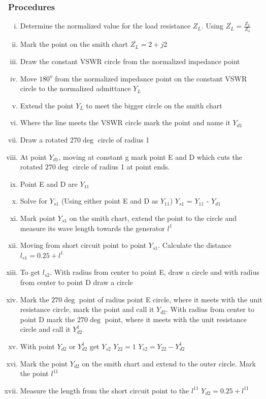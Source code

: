 \begin{exmp}
\subsubsection*{Procedures}
\begin{enumerate}[(i)]
\item Determine the normalized value for the load resistance $Z_{L}$. Using $\overline{Z_{L}} = \frac{Z_{L}}{Z_{o}}$ 
\item Mark the point on the smith chart $\overline{Z_{L}} = 2 + j2$   
\item Draw the constant VSWR circle from the normalized impedance point
\item Move $180^{o}$ from the normalized impedance point on the constant VSWR circle to the normalized admittance $Y_{L}$
\item Extend the point $Y_{L}$ to meet the bigger circle on the smith chart 
\item Where the line meets the VSWR circle mark the point and name it $Y_{d1}$                       
\item Draw a rotated $270\deg $ circle of radius 1                                                  
\item At point $Y_{d1}$, moving at constant g mark point E and D which cuts the rotated $270\deg $ circle of radius 1 at point ends.
\item Point E and D are $Y_{11}$                                                
\item Solve for $Y_{s1}$ (Using either point E and D as $Y_{11}$) $Y_{s1}$ =    $Y_{11}$ -    $Y_{d1}$                     
\item Mark point $Y_{s1}$ on the smith chart, extend the point to the circle and measure its wave length  towards the generator $l^{1}$ 
\item Moving from short circuit point to point $Y_{s1}$. Calculate the distance
$ l_{s1} = 0.25 + l^{1} $                                                                        
\item To get $l_{s2}$. With radius from center to point E, draw a circle and with radius from center to point D draw a circle
\item Mark the $270\deg$ point of radius point E circle, where it meets with the unit resistance circle, mark the point and call it $Y_{d2}$. With radius from center to point D mark the $270\deg$ point, where it meets with the unit resistance circle and call it $Y_{d2}^{1}$ 
\item With point $Y_{d2}$ or $Y_{d2}^{1}$ get $Y_{s2}$ $Y_{22}=1$ $Y_{s2}=Y_{22}-Y_{d2}^{1}$
\item Mark the point $Y_{d2}$ on the smith chart and extend to the outer circle. Mark the point $l^{11}$
\item Measure the length from the short circuit point to the $l^{11}$ $Y_{d2} = 0.25 + l^{11}$
\end{enumerate}
\end{exmp}

